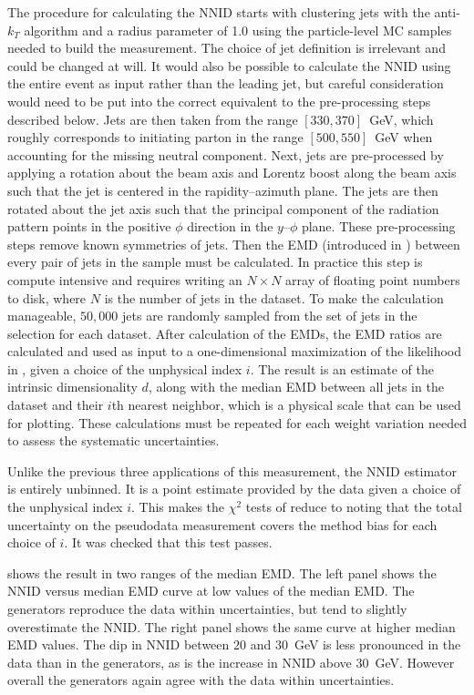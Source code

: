 The procedure for calculating the NNID starts with clustering jets with the anti-$k_T$ algorithm and a radius parameter of 1.0 using the particle-level MC samples needed to build the measurement.
The choice of jet definition is irrelevant and could be changed at will.
It would also be possible to calculate the NNID using the entire event as input rather than the leading jet, but careful consideration would need to be put into the correct equivalent to the pre-processing steps described below.
Jets are then taken from the \pt range $[330, 370]$~GeV, which roughly corresponds to initiating parton \pt in the range $[500, 550]$~GeV when accounting for the missing neutral component.
Next, jets are pre-processed by applying a rotation about the beam axis and Lorentz boost along the beam axis such that the jet is centered in the rapidity--azimuth plane.
The jets are then rotated about the jet axis such that the principal component of the radiation pattern points in the positive $\phi$ direction in the $y$--$\phi$ plane.
These pre-processing steps remove known symmetries of jets.
Then the EMD (introduced in ) between every pair of jets in the sample must be calculated.
In practice this step is compute intensive and requires writing an $N \times N$ array of floating point numbers to disk, where $N$ is the number of jets in the dataset.
To make the calculation manageable, $50,000$ jets are randomly sampled from the set of jets in the \pt selection for each dataset.
After calculation of the EMDs, the EMD ratios are calculated and used as input to a one-dimensional maximization of the likelihood in , given a choice of the unphysical index $i$.
The result is an estimate of the intrinsic dimensionality $d$, along with the median EMD between all jets in the dataset and their $i$th nearest neighbor, which is a physical scale that can be used for plotting.
These calculations must be repeated for each weight variation needed to assess the systematic uncertainties.

Unlike the previous three applications of this measurement, the NNID estimator is entirely unbinned.
It is a point estimate provided by the data given a choice of the unphysical index $i$.
This makes the $\chi^2$ tests of  reduce to noting that the total uncertainty on the pseudodata measurement covers the method bias for each choice of $i$.
It was checked that this test passes.

 shows the result in two ranges of the median EMD.
The left panel shows the NNID versus median EMD curve at low values of the median EMD.
The generators reproduce the data within uncertainties, but tend to slightly overestimate the NNID.
The right panel shows the same curve at higher median EMD values.
The dip in NNID between $20$ and $30$~GeV is less pronounced in the data than in the generators, as is the increase in NNID above $30$~GeV.
However overall the generators again agree with the data within uncertainties.

